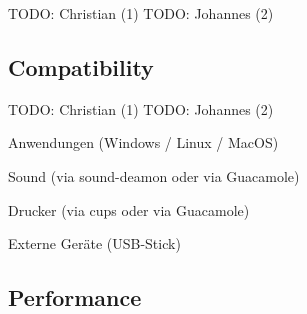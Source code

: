 \documentclass[runningheads]{llncs}
\begin{document}
TODO: Christian (1)
TODO: Johannes (2)

\subsection{Compatibility}

TODO: Christian (1)
TODO: Johannes (2)

Anwendungen (Windows / Linux / MacOS)

Sound (via sound-deamon oder via Guacamole)

Drucker (via cups oder via Guacamole)

Externe Geräte (USB-Stick)


\subsection{Performance}
%
%
\end{document}
